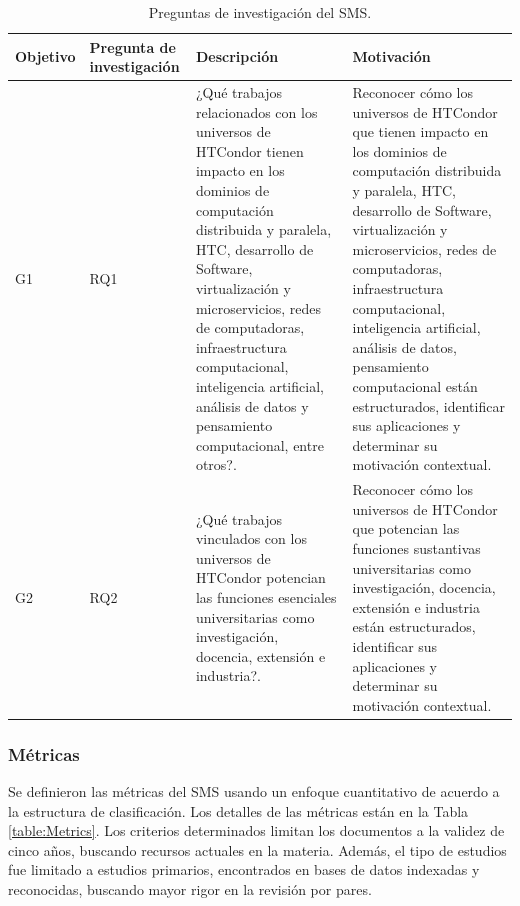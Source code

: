 \begin{table}[htbp]
	\centering
	\caption{Preguntas de investigación del SMS.}
	\label{table:RQs}
	\renewcommand{\arraystretch}{1}  %
	\begin{tabular}{p{1cm}p{1.7cm}p{6.8cm}p{6.8cm}}
		\toprule
		\textbf{Objetivo} & \textbf{Pregunta de investigación} & \textbf{Descripción} &\textbf{Motivación}\\
		\midrule
		G1 & RQ1 & ¿Qué trabajos relacionados con los universos de HTCondor tienen impacto en los dominios de computación distribuida y paralela, HTC, desarrollo de Software, virtualización y microservicios, redes de computadoras, infraestructura computacional, inteligencia artificial, análisis de datos y pensamiento computacional, entre otros?. & Reconocer cómo los universos de HTCondor que  tienen impacto en los dominios de computación distribuida y paralela, HTC, desarrollo de Software, virtualización y microservicios, redes de computadoras, infraestructura computacional, inteligencia artificial, análisis de datos, pensamiento computacional están estructurados, identificar sus aplicaciones y determinar su motivación contextual.\\
		\addlinespace[0.8em]
		G2 & RQ2 & ¿Qué trabajos vinculados con los universos de HTCondor potencian las funciones esenciales universitarias como investigación, docencia, extensión e industria?. & Reconocer cómo los universos de HTCondor que potencian las funciones sustantivas universitarias como investigación, docencia, extensión e industria están estructurados, identificar sus aplicaciones y determinar su motivación contextual.\\
		\bottomrule
	\end{tabular}
\end{table}

\subsubsection{Métricas}
Se definieron las métricas del SMS usando un enfoque cuantitativo de acuerdo a la estructura de clasificación. Los detalles de las métricas están en la Tabla \ref{table:Metrics}. Los criterios determinados limitan los documentos a la validez de cinco años, buscando recursos actuales en la materia. Además, el tipo de estudios fue limitado a estudios primarios, encontrados en bases de datos indexadas y reconocidas, buscando mayor rigor en la revisión por pares.


